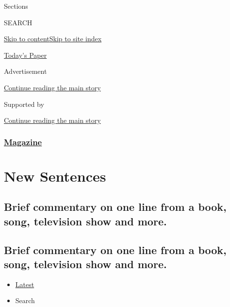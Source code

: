 Sections

SEARCH

\protect\hyperlink{site-content}{Skip to
content}\protect\hyperlink{site-index}{Skip to site index}

\href{https://myaccount.nytimes3xbfgragh.onion/auth/login?response_type=cookie\&client_id=vi}{}

\href{https://www.nytimes3xbfgragh.onion/section/todayspaper}{Today's
Paper}

Advertisement

\protect\hyperlink{after-top}{Continue reading the main story}

Supported by

\protect\hyperlink{after-sponsor}{Continue reading the main story}

\hypertarget{magazine}{%
\subsubsection{\texorpdfstring{\href{/section/magazine}{Magazine}}{Magazine}}\label{magazine}}

\hypertarget{new-sentences}{%
\section{New Sentences}\label{new-sentences}}

\hypertarget{brief-commentary-on-one-line-from-a-book-song-television-show-and-more}{%
\subsection{Brief commentary on one line from a book, song, television
show and
more.}\label{brief-commentary-on-one-line-from-a-book-song-television-show-and-more}}

\hypertarget{brief-commentary-on-one-line-from-a-book-song-television-show-and-more-1}{%
\subsection{Brief commentary on one line from a book, song, television
show and
more.}\label{brief-commentary-on-one-line-from-a-book-song-television-show-and-more-1}}

\begin{itemize}
\tightlist
\item
  \protect\hyperlink{stream-panel}{Latest}
\item
  Search
\end{itemize}

